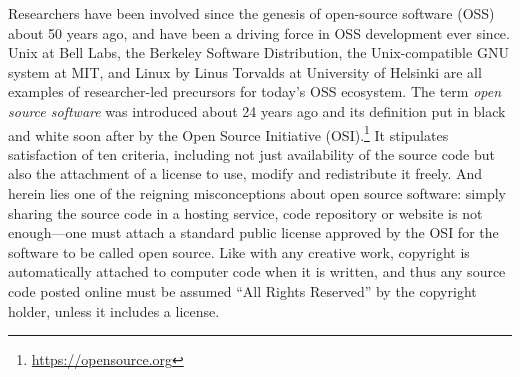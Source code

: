 \documentclass{statement}
\begin{document}
Researchers have been involved since the genesis of open-source software (OSS) about 50 years ago, and have been a driving force in OSS development ever since. 
Unix at Bell Labs, the Berkeley Software Distribution, the Unix-compatible GNU system at MIT, and Linux by Linus Torvalds at University of Helsinki are all examples of researcher-led precursors for today's OSS ecosystem.  
The term \emph{open source software} was introduced about 24 years ago \citep{peterson2008} and its definition put in black and white soon after by the Open Source Initiative (OSI).\footnote{\url{https://opensource.org}} 
It stipulates satisfaction of ten criteria, including not just availability of the source code but also the attachment of a license to use, modify and redistribute it freely. 
And herein lies one of the reigning misconceptions about open source software: simply sharing the source code in a hosting service, code repository or website is not enough---one must attach a standard public license approved by the OSI for the software to be called open source. 
Like with any creative work, copyright is automatically attached to computer code when it is written, and thus any source code posted online must be assumed ``All Rights Reserved'' by the copyright holder, unless it includes a license. 
\end{document}
